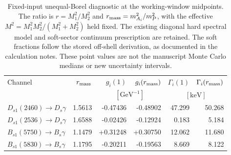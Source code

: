 \begin{table}[ht]
\centering
\begin{tabular}{lrrrrr}
\hline
Channel & $r_{\rm mass}$ & $g_i(1)$ & $g_i(r_{\rm mass})$ & $\Gamma_i(1)$ & $\Gamma_i(r_{\rm mass})$ \\
 & & \multicolumn{2}{c}{$[\mathrm{GeV}^{-1}]$} & \multicolumn{2}{c}{$[\mathrm{keV}]$} \\
\hline
$D_{s1}(2460)\to D_s\gamma$ & 1.5613 & -0.47436 & -0.48902 & 47.299 & 50.268 \\
$D_{s1}(2536)\to D_s\gamma$ & 1.6588 & -0.02426 & -0.12924 & 0.183 & 5.184 \\
$B_{s1}(5750)\to B_s\gamma$ & 1.1479 & +0.31248 & +0.30750 & 12.062 & 11.680 \\
$B_{s1}(5830)\to B_s\gamma$ & 1.1795 & -0.20211 & -0.19563 & 8.669 & 8.122 \\
\hline
\end{tabular}
\caption{Fixed-input unequal-Borel diagnostic at the working-window midpoints.
The ratio is $r=M_1^2/M_2^2$ and $r_{\rm mass}=m_{A_i}^2/m_P^2$,
with the effective $M^2=M_1^2M_2^2/(M_1^2+M_2^2)$ held fixed.
The existing diagonal hard spectral model and soft-sector continuum prescription are retained.
The soft fractions follow the stored off-shell derivation, as documented in the calculation notes.
These point values are not the manuscript Monte Carlo medians or new uncertainty intervals.}
\label{tab:borel-diagnostic-author-review}
\end{table}
